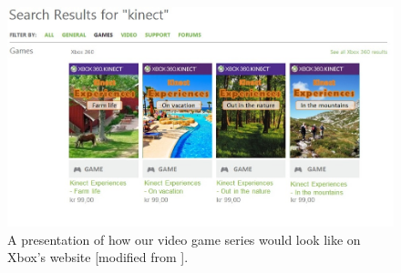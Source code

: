 \begin{figure} [H]
\centering
\includegraphics[scale=0.5, angle=90]{videoGameSeries.jpg}
\caption[Presentation of our video game series in a Xbox website view]{A presentation of how our video game series would look like on Xbox's website [modified from \cite{XboxNettside}].}
\label{fig:videogameseriesHele}
\end{figure}

